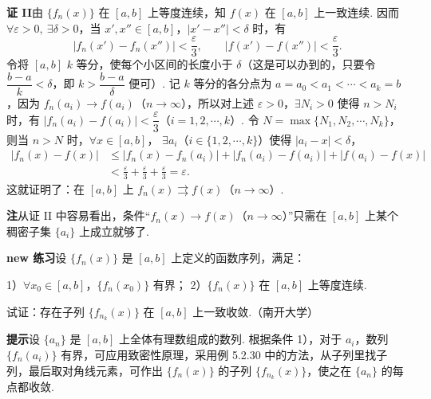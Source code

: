 \documentclass[UTF8,12pt,a4paper,fontset=fandol]{ctexart}
\begin{document}
\noindent\textbf{证 II}\quad 由 $\{f_n(x)\}$ 在 $[a,b]$ 上等度连续，知 $f(x)$ 在
$[a,b]$ 上一致连续. 因而 $\forall\varepsilon>0,\ \exists\delta>0$，当
$x',x''\in[a,b]$，$|x'-x''|<\delta$ 时，有
\[
  |f_n(x')-f_n(x'')|<\frac\varepsilon3,\qquad
  |f(x')-f(x'')|<\frac\varepsilon3.
\]
令将 $[a,b]$ $k$ 等分，使每个小区间的长度小于 $\delta$（这是可以办到的，只要令
$\dfrac{b-a}{k}<\delta$，即 $k>\dfrac{b-a}{\delta}$ 便可）. 记 $k$ 等分的各分点为
$a=a_0<a_1<\cdots<a_k=b$，因为 $f_n(a_i)\to f(a_i)$（$n\to\infty$），所以对上述
$\varepsilon>0$，$\exists N_i>0$ 使得 $n>N_i$ 时，有
$|f_n(a_i)-f(a_i)|<\dfrac\varepsilon3$（$i=1,2,\cdots,k$）. 令
$N=\max\{N_1,N_2,\cdots,N_k\}$，则当 $n>N$ 时，$\forall x\in[a,b]$，
$\exists a_i$（$i\in\{1,2,\cdots,k\}$）使得 $|a_i-x|<\delta$，
\[
\begin{aligned}
  |f_n(x)-f(x)|
  &\le |f_n(x)-f_n(a_i)|+|f_n(a_i)-f(a_i)|+|f(a_i)-f(x)|\\
  &<\frac\varepsilon3+\frac\varepsilon3+\frac\varepsilon3=\varepsilon.
\end{aligned}
\]
这就证明了：在 $[a,b]$ 上 $f_n(x)\rightrightarrows f(x)$（$n\to\infty$）.

\noindent\textbf{注}\quad 从证 II 中容易看出，条件“$f_n(x)\to f(x)$（$n\to\infty$）”只需在
$[a,b]$ 上某个稠密子集 $\{a_i\}$ 上成立就够了.

\noindent\textbf{new 练习}\quad 设 $\{f_n(x)\}$ 是 $[a,b]$ 上定义的函数序列，满足：

1）$\forall x_0\in[a,b]$，$\{f_n(x_0)\}$ 有界；
2）$\{f_n(x)\}$ 在 $[a,b]$ 上等度连续.

试证：存在子列 $\{f_{n_k}(x)\}$ 在 $[a,b]$ 上一致收敛.（南开大学）

\noindent\textbf{提示}\quad 设 $\{a_n\}$ 是 $[a,b]$ 上全体有理数组成的数列. 根据条件 1），对于
$a_i$，数列 $\{f_n(a_i)\}$ 有界，可应用致密性原理，采用例 5.2.30 中的方法，从子列里找子列，最后取对角线元素，可作出
$\{f_n(x)\}$ 的子列 $\{f_{n_k}(x)\}$，使之在 $\{a_n\}$ 的每点都收敛.
\end{document}
